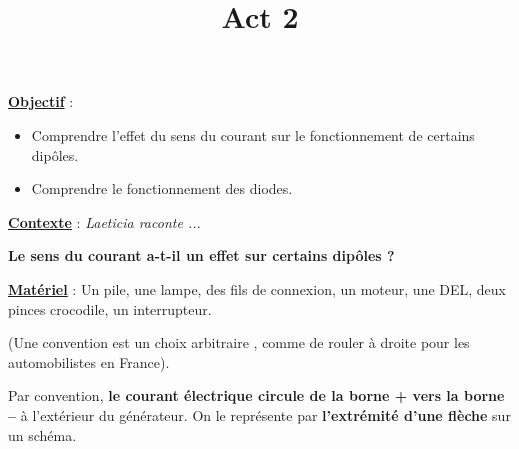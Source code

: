 \documentclass[10pt]{article}
\newcommand{\titreActivite}{Act 2} %
\newcommand{\objectif}{ 	
	
	\begin{itemize}
		\item Comprendre l'effet du sens du courant sur le fonctionnement de certains dipôles.
		\item Comprendre le fonctionnement des diodes.
	\end{itemize}
} %
\newcommand{\contexte}{
	Laeticia raconte ...
}
\newcommand{\resumeContexte}{
	Le sens du courant a-t-il un effet sur certains dipôles ?
	} %
\begin{document}
\date{}
\title{\titreActivite}
\maketitle %


\underline{\textbf{Objectif}} :  \vspace{2pt}
\objectif

\vspace{4pt}

\underline{\textbf{Contexte}} :  \textit{\contexte}

\textbf{\resumeContexte}


\vspace{-12pt}


\textbf{\underline{Matériel}} : Un pile, une lampe, des fils de connexion, un moteur, une DEL, deux pinces
 crocodile, un
interrupteur.


\begin{mybox}[Convention]
	(Une convention est un choix arbitraire
	, comme de rouler à droite pour les automobilistes en France). 
	
	Par convention,
	\textbf{le courant électrique circule de la borne +
	vers la borne –} à l’extérieur du générateur.
	On le représente par \textbf{l’extrémité d’une flèche} sur un schéma.

\end{mybox}

\begin{question}
	
	\end{question}
\end{document}

